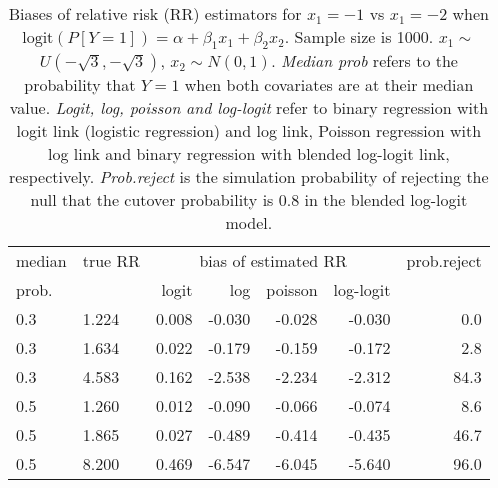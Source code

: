 \documentclass[12pt,a4paper]{article}
\begin{document}
\begin{table}[H] 
\small\sf\centering 
\caption{Biases of relative risk (RR) estimators for $x_1=-1$ vs $x_1=-2$ when $\mbox{logit}(P[Y=1])=\alpha+\beta_1 x_1 + \beta_2 x_2$. Sample size is 1000. $x_1 \sim $$U(-\sqrt{3},-\sqrt{3})$, $x_2 \sim N(0,1)$. {\it Median prob} refers to the probability that $Y=1$ when both covariates are at their median value. {\it Logit, log, poisson and log-logit} refer to binary regression with logit link (logistic regression) and log link, Poisson regression with log link and binary regression with blended log-logit link, respectively. {\it Prob.reject} is the simulation probability of rejecting the null that the cutover probability is $0.8$ in the blended log-logit model.} 
\begin{tabular}{llrrrrr} 
\toprule 
median & true RR & \multicolumn{4}{c}{bias of estimated RR} & prob.reject \\ 
prob. & & logit & log & poisson & log-logit  & \\ \midrule 
0.3 & 1.224 & 0.008 & -0.030 & -0.028 & -0.030 &  0.0 \\  
0.3 & 1.634 & 0.022 & -0.179 & -0.159 & -0.172 &  2.8 \\  
0.3 & 4.583 & 0.162 & -2.538 & -2.234 & -2.312 & 84.3 \\  
0.5 & 1.260 & 0.012 & -0.090 & -0.066 & -0.074 &  8.6 \\  
0.5 & 1.865 & 0.027 & -0.489 & -0.414 & -0.435 & 46.7 \\  
0.5 & 8.200 & 0.469 & -6.547 & -6.045 & -5.640 & 96.0 \\  
\bottomrule 
\end{tabular} 
\end{table} 
\end{document}
